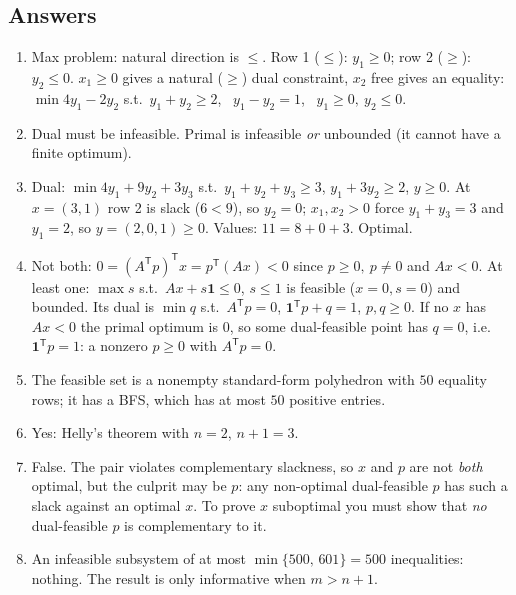 \documentclass[11pt]{article}
\newcommand{\T}{^{\mathsf T}}
\newcommand{\ones}{\mathbf{1}}
\theoremstyle{definition}
\theoremstyle{plain}
\theoremstyle{remark}
\begin{document}
\subsection*{Answers}
\begin{enumerate}
\item Max problem: natural direction is $\le$. Row 1 ($\le$): $y_1\ge0$; row 2 ($\ge$): $y_2\le0$. $x_1\ge0$ gives a natural ($\ge$) dual constraint, $x_2$ free gives an equality:
$\min 4y_1-2y_2$ s.t.\ $y_1+y_2\ge2$, \ $y_1-y_2=1$, \ $y_1\ge0,\ y_2\le0$.
\item Dual must be infeasible. Primal is infeasible \emph{or} unbounded (it cannot have a finite optimum).
\item Dual: $\min4y_1+9y_2+3y_3$ s.t.\ $y_1+y_2+y_3\ge3$, $y_1+3y_2\ge2$, $y\ge0$. At $x=(3,1)$ row 2 is slack ($6<9$), so $y_2=0$; $x_1,x_2>0$ force $y_1+y_3=3$ and $y_1=2$, so $y=(2,0,1)\ge0$. Values: $11=8+0+3$. Optimal.
\item Not both: $0=(A\T p)\T x=p\T(Ax)<0$ since $p\ge0,\ p\neq0$ and $Ax<0$. At least one: $\max s$ s.t.\ $Ax+s\ones\le0$, $s\le1$ is feasible ($x=0,s=0$) and bounded. Its dual is $\min q$ s.t.\ $A\T p=0$, $\ones\T p+q=1$, $p,q\ge0$. If no $x$ has $Ax<0$ the primal optimum is $0$, so some dual-feasible point has $q=0$, i.e.\ $\ones\T p=1$: a nonzero $p\ge0$ with $A\T p=0$.
\item The feasible set is a nonempty standard-form polyhedron with $50$ equality rows; it has a BFS, which has at most $50$ positive entries.
\item Yes: Helly's theorem with $n=2$, $n+1=3$.
\item False. The pair violates complementary slackness, so $x$ and $p$ are not \emph{both} optimal, but the culprit may be $p$: any non-optimal dual-feasible $p$ has such a slack against an optimal $x$. To prove $x$ suboptimal you must show that \emph{no} dual-feasible $p$ is complementary to it.
\item An infeasible subsystem of at most $\min\{500,\,601\}=500$ inequalities: nothing. The result is only informative when $m>n+1$.
\end{enumerate}
\end{document}
